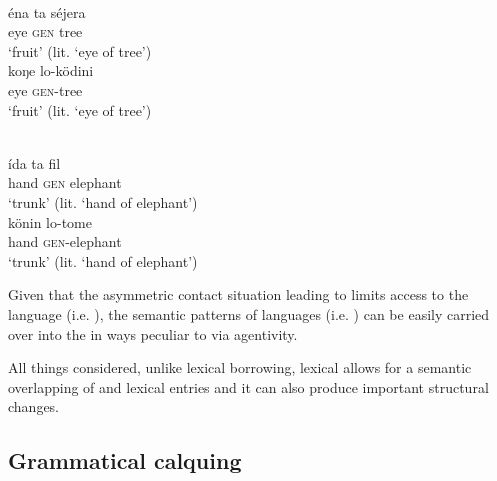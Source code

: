 \documentclass[output=paper]{langsci/langscibook}
\begin{document}
\ea\label{tree}
\begin{multicols}{2}\raggedcolumns
{} \\
\gll   éna ta séjera  \\
       eye \textsc{gen} tree \\
\glt   `fruit’ (lit. ‘eye of tree’)
\columnbreak
{}\\
\gll   koŋe lo-ködini\\
       eye \textsc{gen}-tree\\
\glt   `fruit’ (lit. ‘eye of tree’)
\z\end{multicols}\begin{multicols}{2}\raggedcolumns
\ex\label{eleph}
 \\
\gll   ída ta fil\\
       hand \textsc{gen} elephant \\
\glt   `trunk’ (lit. ‘hand of elephant’)
\columnbreak
{}\\
\gll   könin lo-tome\\
       hand \textsc{gen}-elephant \\
\glt   `trunk’ (lit. ‘hand of elephant’)
\z\end{multicols}
\z

Given that the asymmetric contact situation leading to   limits access to the  language (i.e.  ), the semantic patterns of  languages (i.e. ) can be easily carried over into the  in ways peculiar to  via  agentivity. 

All things considered, unlike lexical borrowing, lexical  allows for a semantic overlapping of  and  lexical entries and it can also produce important structural changes. 


 
 \subsection{Grammatical calquing}\label{sec:gra}
\end{document}
